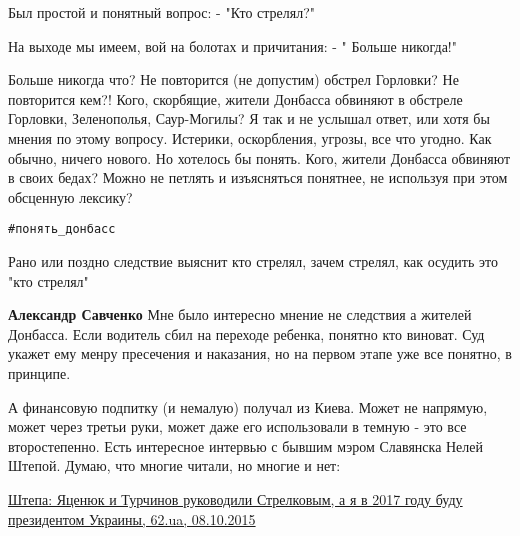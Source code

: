\begin{itemize}
\begin{itemize}
Был простой и понятный вопрос: - "Кто стрелял?"

На выходе мы имеем, вой на болотах и причитания: - " Больше никогда!"

Больше никогда что? Не повторится (не допустим) обстрел Горловки? Не повторится
кем?! Кого, скорбящие, жители Донбасса обвиняют в обстреле Горловки,
Зеленополья, Саур-Могилы? Я так и не услышал ответ, или хотя бы мнения по этому
вопросу. Истерики, оскорбления, угрозы, все что угодно. Как обычно, ничего
нового. Но хотелось бы понять. Кого, жители Донбасса обвиняют в своих бедах?
Можно не петлять и изъясняться понятнее, не используя при этом обсценную
лексику?

\verb|#понять_донбасс|

 
Рано или поздно следствие выяснит кто стрелял, зачем стрелял, как осудить это "кто стрелял"

 
\textbf{Александр Савченко} Мне было интересно мнение не следствия а жителей
Донбасса. Если водитель сбил на переходе ребенка, понятно кто виноват. Суд
укажет ему менру пресечения и наказания, но на первом этапе уже все понятно, в
принципе.

 

А финансовую подпитку (и немалую) получал из Киева. Может не напрямую, может
через третьи руки, может даже его использовали в темную - это все
второстепенно. Есть интересное интервью с бывшим мэром Славянска Нелей Штепой.
Думаю, что многие читали, но многие и нет: 

\href{https://www.62.ua/news/987709}{%
Штепа: Яценюк и Турчинов руководили Стрелковым, а я в 2017 году буду президентом Украины, 62.ua, 08.10.2015%
}

 

\end{itemize}
\end{itemize}
